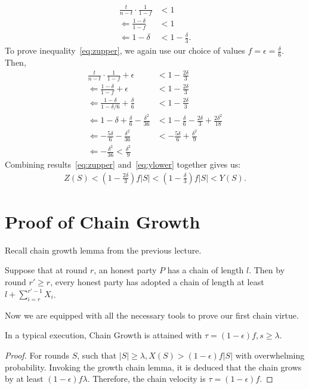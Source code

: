 \begin{align}
\frac{t}{n-t}\cdot\frac{1}{1-f} &< 1\\
\Leftarrow \frac{1-\delta}{1-f} &< 1\\
\Leftarrow 1-\delta &< 1 -\frac{\delta}{3}.
\end{align}
To prove inequality~\ref{eq:zupper}, we again use our choice of values $f = \epsilon = \frac{\delta}{6}$. Then,
\begin{align}
    \frac{t}{n-t}\cdot\frac{1}{1-f} + \epsilon &< 1 - \frac{2\delta}{3}\\
    \Leftarrow \frac{1-\delta}{1-f} + \epsilon &< 1-\frac{2\delta}{3}\\
    \Leftarrow \frac{1-\delta}{1-\delta/6} + \frac{\delta}{6} &< 1 - \frac{2\delta}{3}\\
    \Leftarrow 1-\delta + \frac{\delta}{6} -\frac{\delta^2}{36} &< 1- \frac{\delta}{6} -\frac{2\delta}{3} + \frac{2\delta^2}{18}\\
    \Leftarrow -\frac{5\delta}{6}-\frac{\delta^2}{36} &< -\frac{5\delta}{6} + \frac{\delta^2}{9}\\
    \Leftarrow -\frac{\delta^2}{36} < \frac{\delta^2}{9}
\end{align}
Combining results~\ref{eq:zupper} and~\ref{eq:ylower} together gives us:
\begin{align}
Z(S) < \left(1 - \frac{2\delta}{3}\right)f|S| <  \left(1 - \frac{\delta}{3}\right)f|S| <
Y(S).
\end{align}

\section{Proof of Chain Growth}
Recall chain growth lemma from the previous lecture.
\begin {lemma}
    Suppose that at round $r$, an honest party $P$ has a chain of length $l$. Then by round $r' \geq r$, every honest party has adopted a chain of length at least $l + \sum_{i=r}^{r'-1} X_i$.
\end {lemma}
Now we are equipped with all the necessary tools to prove our first chain virtue.

\begin{theorem}\label{thm:chain-growth}
In a typical execution, Chain Growth is attained with $\tau = (1-\epsilon)f, s \geq \lambda$.
\end{theorem}
\begin{proof}
For rounds $S$, such that $|S| \geq \lambda, X(S) > (1-\epsilon)f|S|$ with overwhelming probability. Invoking the growth chain lemma, it is deduced that the chain grows by at least $(1-\epsilon)f\lambda$. Therefore, the chain velocity is $\tau = (1-\epsilon)f$.
\end{proof}


